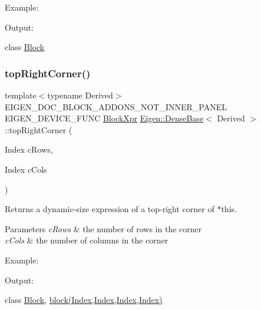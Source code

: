 Example\+: 
\begin{DoxyCodeInclude}{0}
\end{DoxyCodeInclude}
 Output\+: 
\begin{DoxyVerbInclude}
\end{DoxyVerbInclude}
 class \mbox{\hyperlink{class_eigen_1_1_block}{Block}} \mbox{\label{class_eigen_1_1_dense_base_a5ef049952634d83e1c18bcda3a3e980c}} 
\subsubsection{\texorpdfstring{topRightCorner()}{topRightCorner()}\hspace{0.1cm}{\footnotesize\ttfamily [1/3]}}
{\footnotesize\ttfamily template$<$typename Derived$>$ \\
E\+I\+G\+E\+N\+\_\+\+D\+O\+C\+\_\+\+B\+L\+O\+C\+K\+\_\+\+A\+D\+D\+O\+N\+S\+\_\+\+N\+O\+T\+\_\+\+I\+N\+N\+E\+R\+\_\+\+P\+A\+N\+EL E\+I\+G\+E\+N\+\_\+\+D\+E\+V\+I\+C\+E\+\_\+\+F\+U\+NC \mbox{\hyperlink{class_eigen_1_1_block}{Block\+Xpr}} \mbox{\hyperlink{class_eigen_1_1_dense_base}{Eigen\+::\+Dense\+Base}}$<$ Derived $>$\+::top\+Right\+Corner (\begin{DoxyParamCaption}\item[{Index}]{c\+Rows,  }\item[{Index}]{c\+Cols }\end{DoxyParamCaption})\hspace{0.3cm}{\ttfamily [inline]}}

\begin{DoxyReturn}{Returns}
a dynamic-\/size expression of a top-\/right corner of $\ast$this.
\end{DoxyReturn}

\begin{DoxyParams}{Parameters}
{\em c\+Rows} & the number of rows in the corner \\
\hline
{\em c\+Cols} & the number of columns in the corner\\
\hline
\end{DoxyParams}
Example\+: 
\begin{DoxyCodeInclude}{0}
\end{DoxyCodeInclude}
 Output\+: 
\begin{DoxyVerbInclude}
\end{DoxyVerbInclude}
 class \mbox{\hyperlink{class_eigen_1_1_block}{Block}}, \mbox{\hyperlink{class_eigen_1_1_dense_base_ab8e42e67c5cfd5fa13e684642f0f65bf}{block(\+Index,\+Index,\+Index,\+Index)}} \mbox{\label{class_eigen_1_1_dense_base_a54bec6dbd37bc39602e0b8e1177d0010}} 
